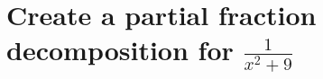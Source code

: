 \documentclass[a4paper]{article}
\title{Quiz #5}
\author{yawnbo}
\date{\today}
\begin{document}
\section{Create a partial fraction decomposition for $\frac{1}{x^2+9}$}%
\label{sec:Question 1}
\end{document}

